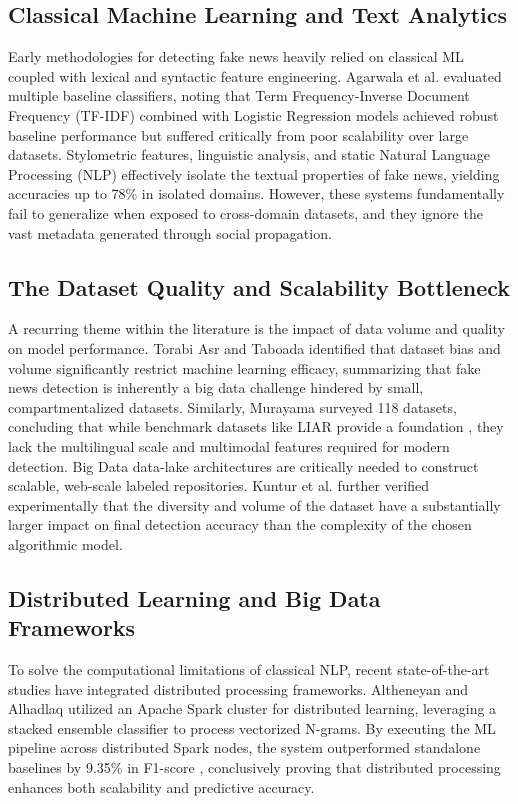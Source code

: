 \documentclass[conference]{IEEEtran}
\begin{document}
\subsection{Classical Machine Learning and Text Analytics}
Early methodologies for detecting fake news heavily relied on classical ML coupled with lexical and syntactic feature engineering. Agarwala et al. evaluated multiple baseline classifiers, noting that Term Frequency-Inverse Document Frequency (TF-IDF) combined with Logistic Regression models achieved robust baseline performance but suffered critically from poor scalability over large datasets. Stylometric features, linguistic analysis, and static Natural Language Processing (NLP) effectively isolate the textual properties of fake news, yielding accuracies up to 78\% in isolated domains. However, these systems fundamentally fail to generalize when exposed to cross-domain datasets, and they ignore the vast metadata generated through social propagation.

\subsection{The Dataset Quality and Scalability Bottleneck}
A recurring theme within the literature is the impact of data volume and quality on model performance. Torabi Asr and Taboada identified that dataset bias and volume significantly restrict machine learning efficacy, summarizing that fake news detection is inherently a big data challenge hindered by small, compartmentalized datasets. Similarly, Murayama surveyed 118 datasets, concluding that while benchmark datasets like LIAR provide a foundation \cite{b3}, they lack the multilingual scale and multimodal features required for modern detection. Big Data data-lake architectures are critically needed to construct scalable, web-scale labeled repositories. Kuntur et al. further verified experimentally that the diversity and volume of the dataset have a substantially larger impact on final detection accuracy than the complexity of the chosen algorithmic model.

\subsection{Distributed Learning and Big Data Frameworks}
To solve the computational limitations of classical NLP, recent state-of-the-art studies have integrated distributed processing frameworks. Altheneyan and Alhadlaq utilized an Apache Spark cluster for distributed learning, leveraging a stacked ensemble classifier to process vectorized N-grams. By executing the ML pipeline across distributed Spark nodes, the system outperformed standalone baselines by 9.35\% in F1-score \cite{b2}, conclusively proving that distributed processing enhances both scalability and predictive accuracy. 
\end{document}
